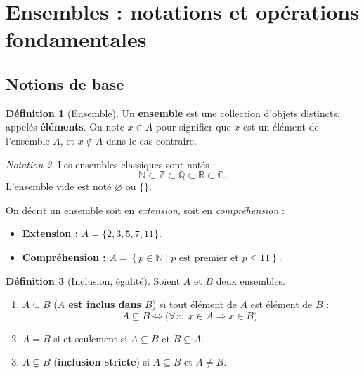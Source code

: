\documentclass[12pt,a4paper,openany]{book}
\theoremstyle{definition}
\newtheorem{definition}{Définition}[chapter]
\theoremstyle{plain}
\theoremstyle{remark}
\newtheorem{notation}[definition]{Notation}
\newcommand{\N}{\mathbb{N}}
\newcommand{\Z}{\mathbb{Z}}
\newcommand{\Q}{\mathbb{Q}}
\newcommand{\R}{\mathbb{R}}
\newcommand{\C}{\mathbb{C}}
\newcommand{\set}[1]{\left\{#1\right\}}
\begin{document}
\section{Ensembles : notations et opérations fondamentales}\label{sec:ensembles-notations}

\subsection{Notions de base}

\begin{definition}[Ensemble]\label{def:ensemble}
Un \textbf{ensemble} est une collection d'objets distincts, appelés
\textbf{éléments}. On note $x \in A$ pour signifier que $x$ est un
élément de l'ensemble $A$, et $x \notin A$ dans le cas contraire.
\end{definition}

\begin{notation}\label{not:ensembles-classiques}
Les ensembles classiques sont notés :
\[
  \N \subset \Z \subset \Q \subset \R \subset \C.
\]
L'ensemble vide est noté $\varnothing$ ou $\{\}$.
\end{notation}

On décrit un ensemble soit en \emph{extension}, soit en \emph{compréhension} :
\begin{itemize}
  \item \textbf{Extension :} $A = \{2, 3, 5, 7, 11\}$.
  \item \textbf{Compréhension :} $A = \set{p \in \N \mid p \text{ est premier et } p \leq 11}$.
\end{itemize}

\begin{definition}[Inclusion, égalité]\label{def:inclusion}
Soient $A$ et $B$ deux ensembles.
\begin{enumerate}
  \item $A \subseteq B$ (\textbf{$A$ est inclus dans $B$}) si tout élément de $A$ est élément de $B$ :
    \[
      A \subseteq B \iff \bigl(\forall x,\; x \in A \Rightarrow x \in B\bigr).
    \]
  \item $A = B$ si et seulement si $A \subseteq B$ et $B \subseteq A$.
  \item $A \subsetneq B$ (\textbf{inclusion stricte}) si $A \subseteq B$ et $A \neq B$.
\end{enumerate}
\end{definition}
\end{document}
